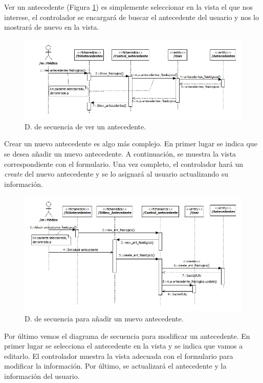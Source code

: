 				Ver un antecedente (Figura \ref{fig:cont_ficha_ant}) es simplemente seleccionar en la vista el que nos interese, el controlador se encargará de buscar el antecedente del usuario y nos lo mostrará de nuevo en la vista.
				
				\begin{figure}[H]
				  \centering
				    \includegraphics[width=16cm]{img/jpg/secuencia/25_ficha_showanteced.jpg}
				  \caption{D. de secuencia de ver un antecedente.}
				  \label{fig:cont_ficha_ant}
				\end{figure}
			
			Crear un nuevo antecedente es algo más complejo. En primer lugar se indica que se desea añadir un nuevo antecedente. A continuación, se muestra la vista correspondiente con el formulario. Una vez completo, el controlador hará un \textit{create} del nuevo antecedente y se lo asignará al usuario actualizando su información.
			
				\begin{figure}[H]
				  \centering
				    \includegraphics[width=16cm]{img/jpg/secuencia/26_ficha_new_ant.jpg}
				  \caption{D. de secuencia para añadir un nuevo antecedente.}
				  \label{fig:cont_ficha_ant_new}
				\end{figure}
			
			Por último vemos el diagrama de secuencia para modificar un antecedente. En primer lugar se selecciona el antecedente en la vista y se indica que vamos a editarlo. El controlador muestra la vista adecuada con el formulario para modificar la información. Por último, se actualizará el antecedente y la información del usuario.
			
